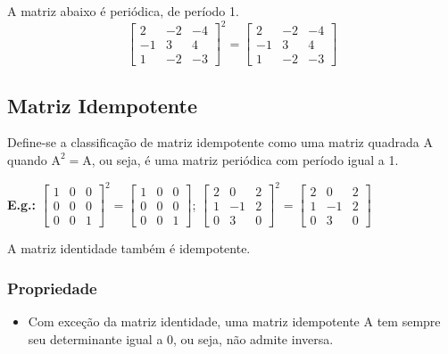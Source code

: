 \documentclass[a4paper,12pt]{article}
\begin{document}
A matriz abaixo é periódica, de período 1.
$$ \begin{bmatrix}
2 & -2 & -4\\
-1 & 3 & 4\\
1 & -2 & -3
\end{bmatrix}^{2} = \begin{bmatrix}
2 & -2 & -4\\
-1 & 3 & 4\\
1 & -2 & -3
\end{bmatrix} $$

\subsection{Matriz Idempotente}

Define-se a classificação de matriz idempotente como uma matriz quadrada $ \text{A} $ quando $ \text{A}^{2} = \text{A} $, ou seja, é uma matriz periódica com período igual a 1.

\textbf{E.g.:} $ \begin{bmatrix}
1 & 0 & 0 \\
0 & 0 & 0 \\
0 & 0 & 1
\end{bmatrix}^{2} = \begin{bmatrix}
1 & 0 & 0 \\
0 & 0 & 0 \\
0 & 0 & 1
\end{bmatrix} $; $ \begin{bmatrix}
2 & 0 & 2\\
1 & -1 & 2\\
0 & 3 & 0
\end{bmatrix}^{2} = \begin{bmatrix}
2 & 0 & 2\\
1 & -1 & 2\\
0 & 3 & 0
\end{bmatrix} $

A matriz identidade também é idempotente.

\subsubsection{Propriedade}

\begin{itemize}
    \item Com exceção da matriz identidade, uma matriz idempotente $ \text{A} $ tem sempre seu determinante igual a 0, ou seja, não admite inversa.
\end{itemize}
\end{document}
